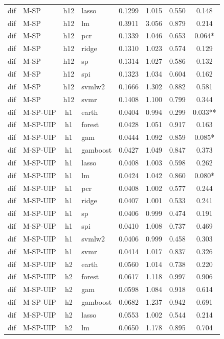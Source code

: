 \begin{ThreePartTable}
\begin{longtable}[t]{llclcccc}
dif & M-SP & h12 & lasso & 0.1299 & 1.015 & 0.550 & 0.148\\
dif & M-SP & h12 & lm & 0.3911 & 3.056 & 0.879 & 0.214\\
dif & M-SP & h12 & pcr & 0.1339 & 1.046 & 0.653 & 0.064*\\
dif & M-SP & h12 & ridge & 0.1310 & 1.023 & 0.574 & 0.129\\
dif & M-SP & h12 & sp & 0.1314 & 1.027 & 0.586 & 0.132\\
dif & M-SP & h12 & spi & 0.1323 & 1.034 & 0.604 & 0.162\\
dif & M-SP & h12 & svmlw2 & 0.1666 & 1.302 & 0.882 & 0.581\\
dif & M-SP & h12 & svmr & 0.1408 & 1.100 & 0.799 & 0.344\\
\addlinespace
dif & M-SP-UIP & h1 & earth & 0.0404 & 0.994 & 0.299 & 0.033**\\
dif & M-SP-UIP & h1 & forest & 0.0428 & 1.051 & 0.917 & 0.163\\
dif & M-SP-UIP & h1 & gam & 0.0444 & 1.092 & 0.859 & 0.085*\\
dif & M-SP-UIP & h1 & gamboost & 0.0427 & 1.049 & 0.847 & 0.373\\
dif & M-SP-UIP & h1 & lasso & 0.0408 & 1.003 & 0.598 & 0.262\\
dif & M-SP-UIP & h1 & lm & 0.0424 & 1.042 & 0.860 & 0.080*\\
dif & M-SP-UIP & h1 & pcr & 0.0408 & 1.002 & 0.577 & 0.244\\
dif & M-SP-UIP & h1 & ridge & 0.0407 & 1.001 & 0.533 & 0.241\\
dif & M-SP-UIP & h1 & sp & 0.0406 & 0.999 & 0.474 & 0.191\\
dif & M-SP-UIP & h1 & spi & 0.0410 & 1.008 & 0.737 & 0.469\\
dif & M-SP-UIP & h1 & svmlw2 & 0.0406 & 0.999 & 0.458 & 0.303\\
dif & M-SP-UIP & h1 & svmr & 0.0414 & 1.017 & 0.837 & 0.326\\
\addlinespace
dif & M-SP-UIP & h2 & earth & 0.0560 & 1.014 & 0.738 & 0.220\\
dif & M-SP-UIP & h2 & forest & 0.0617 & 1.118 & 0.997 & 0.906\\
dif & M-SP-UIP & h2 & gam & 0.0598 & 1.084 & 0.918 & 0.614\\
dif & M-SP-UIP & h2 & gamboost & 0.0682 & 1.237 & 0.942 & 0.691\\
dif & M-SP-UIP & h2 & lasso & 0.0553 & 1.002 & 0.544 & 0.214\\
dif & M-SP-UIP & h2 & lm & 0.0650 & 1.178 & 0.895 & 0.704\\

\end{longtable}
\end{ThreePartTable}
